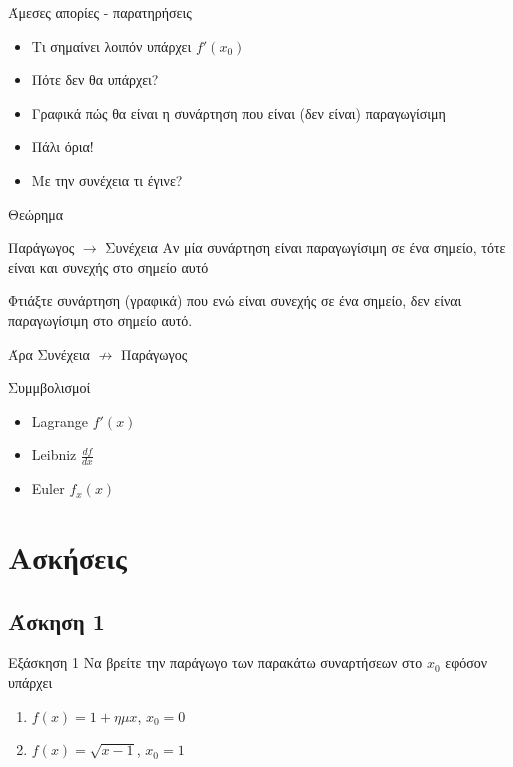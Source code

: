 \documentclass[greek]{beamer}
\begin{document}
\begin{frame}{Άμεσες απορίες - παρατηρήσεις}
 \begin{itemize}
  \item<1-> Τι σημαίνει λοιπόν υπάρχει $f'(x_0)$
  \item<2-> Πότε δεν θα υπάρχει?
  \item<3-> Γραφικά πώς θα είναι η συνάρτηση που είναι (δεν είναι) παραγωγίσιμη
  \item<4-> Πάλι όρια!
  \item<5-> Με την συνέχεια τι έγινε?
 \end{itemize}
\end{frame}

\begin{frame}{Θεώρημα}
 \begin{block}{Παράγωγος $\to$ Συνέχεια}
  Αν μία συνάρτηση είναι παραγωγίσιμη σε ένα σημείο, τότε είναι και συνεχής στο σημείο αυτό
 \end{block}
  Φτιάξτε συνάρτηση (γραφικά) που ενώ είναι συνεχής σε ένα σημείο, δεν είναι παραγωγίσιμη στο σημείο αυτό.

  Άρα Συνέχεια $\nrightarrow$ Παράγωγος
\end{frame}

\begin{frame}{Συμμβολισμοί}
 \begin{itemize}
  \item<1-> Lagrange $f'(x)$
  \item<2-> Leibniz $\frac{df}{dx}$
  \item<3-> Euler $f_x(x)$
 \end{itemize}
\end{frame}

\section{Ασκήσεις}
\subsection{Άσκηση 1}
\begin{frame}[label=Άσκηση1]{Εξάσκηση 1}
 Να βρείτε την παράγωγο των παρακάτω συναρτήσεων στο $x_0$ εφόσον υπάρχει
 \begin{enumerate}
  \item<1-> $f(x)=1+ημx$, $x_0=0$
  \item<2-> $f(x)=\sqrt{x-1}$, $x_0=1$
 \end{enumerate}

\end{frame}
\end{document}
